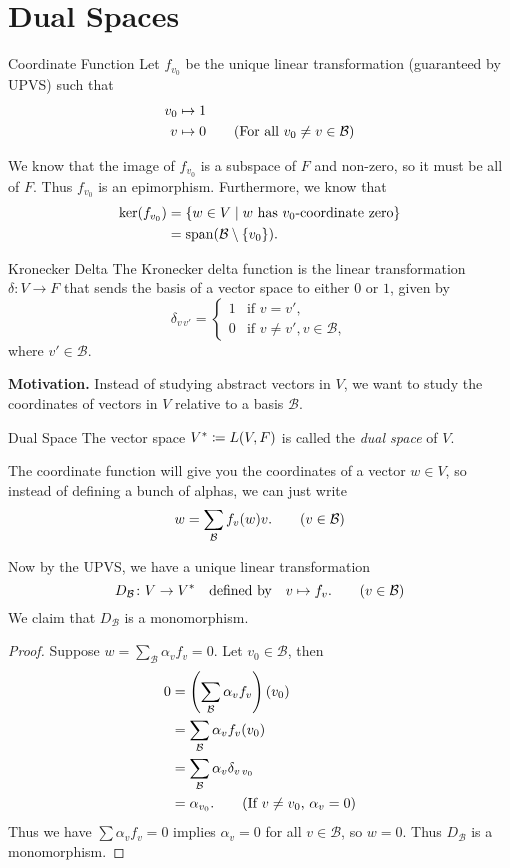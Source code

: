 \documentclass[class=article, crop=false]{standalone}
\begin{document}
  \section{Dual Spaces}
  \begin{definition}{Coordinate Function}
    Let $f_{v_0}$ be the unique linear transformation (guaranteed by UPVS) such that
    \begin{align*}
      v_0 &\mapsto 1 \\
      v &\mapsto 0 \tag{For all $v_0\neq v\in \mathcal{B}$}
    \end{align*}
  \end{definition}
  We know that the image of $f_{v_0}$ is a subspace of $F$ and non-zero, so it must be all of $F$. Thus $f_{v_0}$ is an epimorphism. Furthermore, we know that
  \begin{align*}
    \ker(f_{v_0}) &= \left\{w\in V\mid w \text{ has $v_0$-coordinate zero}\right\} \\
                  &= \operatorname{span}(\mathcal{B}\setminus \left\{v_0\right\}).
  \end{align*}
  \begin{definition}{Kronecker Delta}
    The Kronecker delta function is the linear transformation $\delta\colon V\to F$ that sends the basis of a vector space to either $0$ or $1$, given by
    \[
      \delta_{v\,v'} = \begin{cases}1 & \text{if }v=v',\\0 & \text{if }v\neq v', v\in \mathcal{B},\end{cases}
    \]
    where $v'\in \mathcal{B}$.
  \end{definition}
  \textbf{Motivation.} Instead of studying abstract vectors in $V$, we want to study the coordinates of vectors in $V$ relative to a basis $\mathcal{B}$.
  \begin{definition}{Dual Space}
    The vector space $V^*\coloneqq L(V, F)$ is called the \emph{dual space} of $V$.
  \end{definition}
  \begin{note}{}
    The coordinate function will give you the coordinates of a vector $w\in V$, so instead of defining a bunch of alphas, we can just write
    \[
      w = \sum_{\mathcal{B}}f_v(w)v. \tag{$v\in\mathcal{B}$}
    \]
  \end{note}
  Now by the UPVS, we have a unique linear transformation
  \[
    D_{\mathcal{B}}\colon V\to V^*\quad \text{defined by}\quad v\mapsto f_v.\tag{$v\in \mathcal{B}$}
  \]
  We claim that $D_{\mathcal{B}}$ is a monomorphism.
  \begin{proof}
    Suppose $w = \sum_{\mathcal{B}}\alpha_vf_v = 0$. Let $v_0\in \mathcal{B}$, then
    \begin{align*}
      0 &= \left( \sum_{\mathcal{B}}\alpha_vf_v \right)(v_0) \\
        &= \sum_{\mathcal{B}}\alpha_vf_v(v_0) \\
        &= \sum_{\mathcal{B}}\alpha_v\delta_{v\,v_0} \\
        &= \alpha_{v_0}. \tag{If $v\neq v_0$, $\alpha_v=0$}
    \end{align*}
    Thus we have $\sum \alpha_vf_v = 0$ implies $\alpha_v = 0$ for all $v\in \mathcal{B}$, so $w = 0$. Thus $D_{\mathcal{B}}$ is a monomorphism.
  \end{proof}
\end{document}
